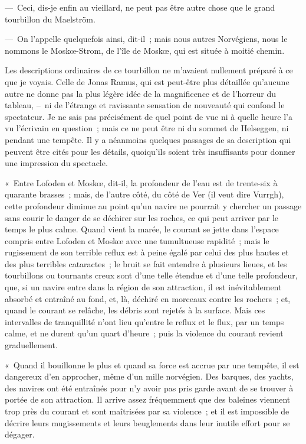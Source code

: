 \documentclass[french,twoside]{book} %
\begin{document}
— Ceci, dis-je enfin au vieillard, ne peut pas être autre chose que le grand tourbillon du Maelström.\par
— On l’appelle quelquefois ainsi, dit-il ; mais nous autres Norvégiens, nous le nommons le Moskœ-Strom, de l’île de Moskœ, qui est située à moitié chemin.\par
Les descriptions ordinaires de ce tourbillon ne m’avaient nullement préparé à ce que je voyais. Celle de Jonas Ramus, qui est peut-être plus détaillée qu’aucune autre ne donne pas la plus légère idée de la magnificence et de l’horreur du tableau, – ni de l’étrange et ravissante sensation de nouveauté qui confond le spectateur. Je ne sais pas précisément de quel point de vue ni à quelle heure l’a vu l’écrivain en question ; mais ce ne peut être ni du sommet de Helseggen, ni pendant une tempête. Il y a néanmoins quelques passages de sa description qui peuvent être cités pour les détails, quoiqu’ils soient très insuffisants pour donner une impression du spectacle.\par
« Entre Lofoden et Moskœ, dit-il, la profondeur de l’eau est de trente-six à quarante brasses ; mais, de l’autre côté, du côté de Ver (il veut dire Vurrgh), cette profondeur diminue au point qu’un navire ne pourrait y chercher un passage sans courir le danger de se déchirer sur les roches, ce qui peut arriver par le temps le plus calme. Quand vient la marée, le courant se jette dans l’espace compris entre Lofoden et Moskœ avec une tumultueuse rapidité ; mais le rugissement de son terrible reflux est à peine égalé par celui des plus hautes et des plus terribles cataractes ; le bruit se fait entendre à plusieurs lieues, et les tourbillons ou tournants creux sont d’une telle étendue et d’une telle profondeur, que, si un navire entre dans la région de son attraction, il est inévitablement absorbé et entraîné au fond, et, là, déchiré en morceaux contre les rochers ; et, quand le courant se relâche, les débris sont rejetés à la surface. Mais ces intervalles de tranquillité n’ont lieu qu’entre le reflux et le flux, par un temps calme, et ne durent qu’un quart d’heure ; puis la violence du courant revient graduellement.\par
« Quand il bouillonne le plus et quand sa force est accrue par une tempête, il est dangereux d’en approcher, même d’un mille norvégien. Des barques, des yachts, des navires ont été entraînés pour n’y avoir pas pris garde avant de se trouver à portée de son attraction. Il arrive assez fréquemment que des baleines viennent trop près du courant et sont maîtrisées par sa violence ; et il est impossible de décrire leurs mugissements et leurs beuglements dans leur inutile effort pour se dégager.\par
\end{document}
